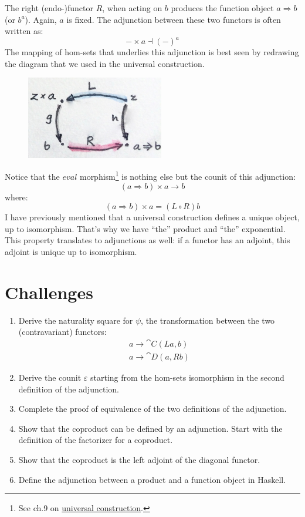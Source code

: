 The right (endo-)functor $R$, when acting on $b$ produces
the function object $a \Rightarrow b$ (or $b^a$). Again, $a$ is
fixed. The adjunction between these two functors is often written as:
\[-\times{}a \dashv (-)^a\]
The mapping of hom-sets that underlies this adjunction is best seen by
redrawing the diagram that we used in the universal construction.

\begin{figure}[H]
\centering
\includegraphics[width=60mm]{images/adj-expo.jpg}
\end{figure}

\noindent
Notice that the $eval$ morphism\footnote{See ch.9 on \hyperref[function-types]{universal
construction}.} is nothing else but the counit of
this adjunction:
\[(a \Rightarrow b)\times{}a \to b\]
where:
\[(a \Rightarrow b)\times{}a = (L \circ R) b\]
I have previously mentioned that a universal construction defines a
unique object, up to isomorphism. That's why we have ``the'' product and
``the'' exponential. This property translates to adjunctions as well: if
a functor has an adjoint, this adjoint is unique up to isomorphism.

\section{Challenges}

\begin{enumerate}
\tightlist
\item
  Derive the naturality square for $\psi$, the transformation
  between the two (contravariant) functors:
\begin{gather*}
a \to \cat{C}(L a, b) \\
a \to \cat{D}(a, R b)
\end{gather*}
\item
  Derive the counit $\varepsilon$ starting from the hom-sets isomorphism in
  the second definition of the adjunction.
\item
  Complete the proof of equivalence of the two definitions of the
  adjunction.
\item
  Show that the coproduct can be defined by an adjunction. Start with
  the definition of the factorizer for a coproduct.
\item
  Show that the coproduct is the left adjoint of the diagonal functor.
\item
  Define the adjunction between a product and a function object in
  Haskell.
\end{enumerate}